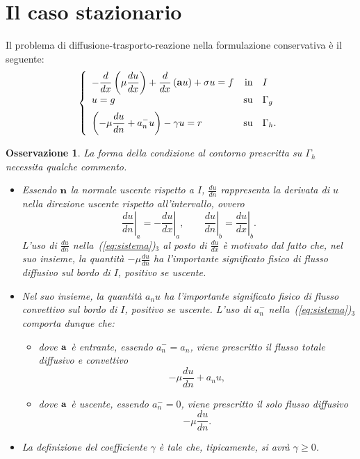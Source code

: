 \documentclass[11pt]{article}
\newtheorem{remark}{Osservazione}[section]
\begin{document}
\section{Il caso stazionario}
Il problema di diffusione-trasporto-reazione nella formulazione
conservativa \`e il seguente:
\begin{equation}
\label{eq:sistema}
\left \{
\begin{array}{lrl}
\displaystyle -\frac{d}{dx} \left( \mu \frac{du}{dx} \right) + 
\frac{d}{dx} \left( {\bf a} u \right) + \sigma u = f 
& {\rm in} & I \\[2mm]
\displaystyle u = g & {\rm su} & \Gamma_g\\[2mm]
\displaystyle \left ( -\mu \frac{du}{dn} + a_n^- u \right) 
- \gamma u = r
& {\rm su} & \Gamma_h.
\end{array}
\right.
\end{equation}
\begin{remark}
La forma della condizione al contorno prescritta su $\Gamma_h$
necessita qualche commento.
\begin{itemize}
\item Essendo ${\bf n}$ la normale uscente rispetto a $I$,
$\frac{du}{dn}$ rappresenta la derivata di $u$ nella direzione uscente
rispetto all'intervallo, ovvero
\[
\left.\frac{du}{dn}\right|_a  =  - \left.\frac{du}{dx}\right|_a,
\qquad
\left.\frac{du}{dn}\right|_b  = \left.\frac{du}{dx}\right|_b.
\]
L'uso di $\frac{du}{dn}$ nella~(\ref{eq:sistema})$_3$ al posto di
$\frac{du}{dx}$ \`e motivato dal fatto che, nel suo insieme, la
quantit\`a $-\mu\frac{du}{dn}$ ha l'importante significato fisico di
\emph{flusso diffusivo sul bordo di $I$, positivo se uscente}.
\item Nel suo insieme, la quantit\`a $a_n u$ ha l'importante
significato fisico di \emph{flusso convettivo sul bordo di $I$,
positivo se uscente}. L'uso di $a_n^-$ nella~(\ref{eq:sistema})$_3$
comporta dunque che:
\begin{itemize}
\item dove ${\bf a}$ \`e entrante, essendo $a_n^-=a_n$, viene
prescritto il flusso totale diffusivo e convettivo
\[
-\mu\frac{du}{dn} + a_n u,
\]
\item dove ${\bf a}$ \`e uscente, essendo $a_n^-=0$, viene
prescritto il solo flusso diffusivo
\[
-\mu\frac{du}{dn}.
\]
\end{itemize}
\item La definizione del coefficiente $\gamma$ \`e tale che,
tipicamente, si avr\`a $\gamma\geq0$.
\end{itemize}
\end{remark}
\end{document}
